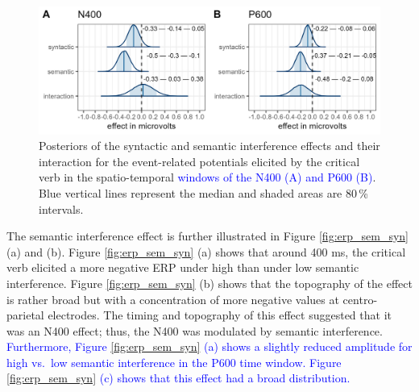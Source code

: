 \documentclass[a4paper, man, floatsintext]{apa7}
\begin{document}
\begin{figure}[H]
    \caption{Posteriors of the syntactic and semantic interference effects and their interaction for the event-related potentials elicited by the critical verb in the spatio-temporal \textcolor{blue}{windows of the N400 (A) and P600 (B)}. Blue vertical lines represent the median and shaded areas are 80\,\% intervals.}
    \label{fig:eeg_posteriors}
    \centering
    \includegraphics[width=\textwidth]{images/posteriors_eeg.jpg}
\end{figure}


The semantic interference effect is further illustrated in Figure \ref{fig:erp_sem_syn} (a) and (b). Figure \ref{fig:erp_sem_syn} (a) shows that around 400 ms, the critical verb elicited a more negative ERP under high than under low semantic interference. Figure \ref{fig:erp_sem_syn} (b) shows that the topography of the effect is rather broad but with a concentration of more negative values at centro-parietal electrodes. The timing and topography of this effect suggested that it was an N400 effect; thus, the N400 was modulated by semantic interference. \textcolor{blue}{Furthermore, Figure \ref{fig:erp_sem_syn} (a) shows a slightly reduced amplitude for high vs.\ low semantic interference in the P600 time window. Figure \ref{fig:erp_sem_syn} (c) shows that this effect had a broad distribution.} \label{ERP_results2}
\end{document}
